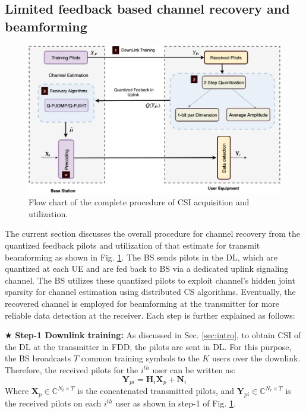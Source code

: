 \subsection {\textbf{Limited feedback based channel recovery and beamforming}}
\label{LF_framework} 
\begin{figure}[h!]
    \centering
    \includegraphics[scale=0.44]{figures/fig_ch_rec/flow_chart_MIMO.jpg}
   \caption{Flow chart of the complete procedure of CSI acquisition and utilization. }
    \label{fig:CSI_flow}
\end{figure}

The current section discusses the overall procedure for channel recovery from the quantized feedback pilots and utilization of that estimate for transmit beamforming as shown in Fig. \ref{fig:CSI_flow}. The BS sends pilots in the DL, which are quantized at each UE and are fed back to BS via a dedicated uplink signaling channel. The BS utilizes these quantized pilots to exploit channel's hidden joint sparsity for channel estimation using distributed CS algorithms. Eventually, the recovered channel is employed for beamforming at the transmitter for more reliable data detection at the receiver. Each step is further explained as follows:  

 
$\bigstar$ \textbf{Step-1 Downlink training:}  
As discussed in Sec. \ref{sec:intro}, to obtain CSI of the DL at the transmitter in FDD, the pilots are sent in DL. For this purpose, the BS broadcasts $T$ common training symbols to the $K$ users over the downlink. Therefore, the received pilots for the $i^{th}$ user can be written as:
\begin{equation}
\mathbf{Y}_{pi} = \mathbf{H}_i \mathbf{X}_p + \mathbf{N}_i
\label{eq_channel_pilot}
\end{equation}
Where $\mathbf{X}_p  \in \mathbb{C}^{N_t \times T}$ is the concatenated transmitted pilots, and $\mathbf{Y}_{pi} \in \mathbb{C}^{N_r \times T}$ is the received pilots on each $i^{th}$ user as shown in step-1 of Fig. \ref{fig:CSI_flow}. \\
   
